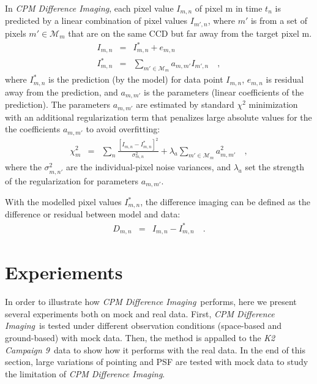 \documentclass[12pt, preprint]{aastex}
\newcommand{\project}[1]{\textsl{#1}}
\newcommand{\cpmdiff}{\project{CPM Difference Imaging}}
\newcommand{\KTCN}{\project{K2 Campaign 9}}
\newcommand{\set}[1]{\mathcal{#1}}
\begin{document}
In \cpmdiff, each pixel value $I_{m,n}$ of pixel m in time $t_n$ is predicted by a linear combination of pixel values $I_{m',n}$, where $m'$ is from a set of pixels $m'\in\set{M}_m$ that are on the same CCD but far away from the target pixel m.
\begin{eqnarray}
I_{m,n}         &=& I^{\ast}_{m,n} + e_{m,n}
\\
I^{\ast}_{m,n}  &=& \sum_{m'\in\set{M}_m} a_{m,m'}I_{m',n} 
\quad,
\end{eqnarray}
where $I^{\ast}_{m,n}$ is the prediction (by the model) for data point $I_{m,n}$, $e_{m,n}$ is residual away from the prediction, and $a_{m,m'}$ is the parameters (linear coefficients of the prediction).
The parameters $a_{m,m'}$ are estimated by standard $\chi^2$ minimization with an additional regularization term that penalizes large absolute values for the the coefficients $a_{m,m'}$ to avoid overfitting:
\begin{eqnarray}
\chi^2_{m}    &=& \sum_{n} \frac{[I_{m,n} - I^{\ast}_{m,n}]^2}{\sigma^2_{m,n}}+ \lambda_{a}\sum_{m'\in\set{M}_m}a_{m,m'}^2 
\quad,
\end{eqnarray}
where the $\sigma^2_{m,n'}$ are the individual-pixel noise variances, and $\lambda_{a}$ set the strength of the regularization for parameters $a_{m,m'}$.

With the modelled pixel values $I^{\ast}_{m,n}$, the difference imaging can be defined as the difference or residual between model and data:
\begin{eqnarray}
D_{m,n} &=& I_{m,n} - I^{\ast}_{m,n}
\quad.
\end{eqnarray}

\section{Experiements}
In order to illustrate how \cpmdiff\ performs, here we present several experiments both on mock and real data. 
First, \cpmdiff\ is tested under different observation conditions (space-based and ground-based) with mock data. 
Then,  the method is appalled to the \KTCN\ data to show how it performs with the real data. 
In the end of this section,  large variations of pointing and PSF are tested with mock data to study the limitation of \cpmdiff.
\end{document}
